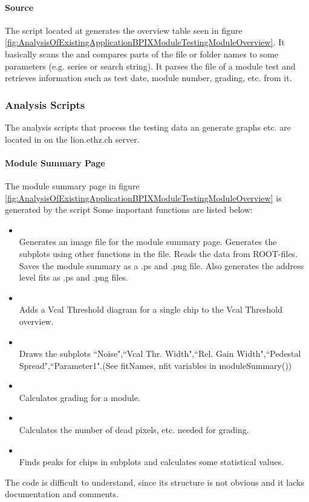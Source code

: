 \documentclass[0_Bericht]{subfiles}
\begin{document}
				\paragraph{Source}
					The script located at  generates the overview table seen in figure \ref{fig:AnalysisOfExistingApplicationBPIXModuleTestingModuleOverview}.
					It basically scans the  and compares parts of the file or folder names to some parameters (e.g. series or search string). It parses the  file of a module test and retrieves information such as test date, module number, grading, etc. from it.
			\subsubsection{Analysis Scripts}
			The analysis scripts that process the testing data an generate graphs etc. are located in  on the lion.ethz.ch server.
				\paragraph{Module Summary Page}
					The module summary page in figure \ref{fig:AnalysisOfExistingApplicationBPIXModuleTestingModuleOverview} is generated by the script 
					Some important functions are listed below:
					\begin{itemize}
						\item {} \\
							Generates an image file for the module summary page. 
							Generates the subplots using other functions in the file. Reads the data from ROOT-files. Saves the module summary as a .ps and .png file. Also generates the address level fits as .ps and .png files.
						\item {} \\
							Adds a Vcal Threshold diagram for a single chip to the Vcal Threshold overview.
						\item {} \\
							Draws the subplots ``Noise",``Vcal Thr. Width",``Rel. Gain Width",``Pedestal Spread",``Parameter1".(See fitNames, nfit variables in moduleSummary())
						\item {} \\
							Calculates grading for a module.
						\item {} \\
							Calculates the number of dead pixels, etc. needed for grading.
						\item {} \\
							Finds peaks for chips in subplots and calculates some statistical values.	
					\end{itemize}
					The code is difficult to understand, since its structure is not obvious and it lacks documentation and comments.
\end{document}
